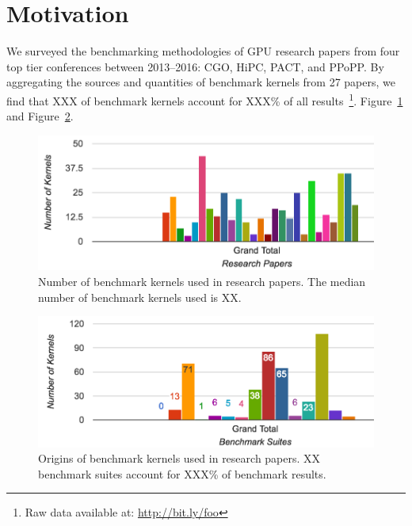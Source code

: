 \documentclass[preprint,nonatbib,10pt,nocopyrightspace]{sigplanconf}
\begin{document}
\section{Motivation}\label{sec:motivation}

We surveyed the benchmarking methodologies of GPU research papers from
four top tier conferences between 2013--2016: CGO, HiPC, PACT, and
PPoPP. By aggregating the sources and quantities of benchmark kernels
from 27 papers, we find that XXX of benchmark kernels account for
XXX\% of all results~\footnote{Raw data available at:
  \url{http://bit.ly/foo}}. Figure~\ref{fig:benchmark-quantity-distribution}
and Figure~\ref{fig:benchmark-suite-distribution}.


\begin{figure}[t]
  \includegraphics[width=\columnwidth]{img/benchmark-quantitiy-distribution}
  \caption{%
    Number of benchmark kernels used in research papers. The median
    number of benchmark kernels used is XX.%
  }
  \label{fig:benchmark-quantity-distribution}
\end{figure}

\begin{figure}[t]
  \includegraphics[width=\columnwidth]{img/benchmark-suite-distribution}
  \caption{%
    Origins of benchmark kernels used in research papers. XX benchmark
    suites account for XXX\% of benchmark results.%
  }
  \label{fig:benchmark-suite-distribution}
\end{figure}
\end{document}
